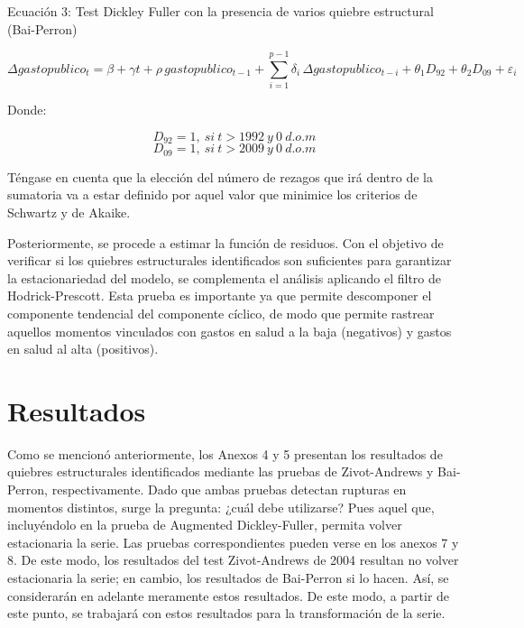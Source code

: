 \documentclass[12pt]{article}
\begin{document}
\bigskip
\begin{center}
Ecuación 3: Test Dickley Fuller con la presencia de varios quiebre estructural (Bai-Perron)
\end{center}
\begin{equation}
\Delta gastopublic{o}_{t} = \beta + \gamma t + \rho \, gastopublic{o}_{t-1} + \sum_{i=1}^{p-1} \delta_{i} \, \Delta gastopublic{o}_{t-i} + \theta_{1} D_{92} + \theta_{2} D_{09} + \varepsilon_{i}
\end{equation}
\begin{center}
Donde: 
\end{center}
\begin{equation*}
D_{92}=1,\ si\ t>1992\ y\ 0\ d.o.m
\end{equation*}
\begin{equation*}
D_{09}=1,\ si\ t>2009\ y\ 0\ d.o.m
\end{equation*}

Téngase en cuenta que la elección del número de rezagos que irá dentro de la sumatoria va a estar definido por aquel valor que minimice los criterios de Schwartz y de Akaike. 

Posteriormente, se procede a estimar la función de residuos. Con el objetivo de verificar si los quiebres estructurales identificados son suficientes para garantizar la estacionariedad del modelo, se complementa el análisis aplicando el filtro de Hodrick-Prescott. Esta prueba es importante ya que permite descomponer el componente tendencial del componente cíclico, de modo que permite rastrear aquellos momentos vinculados con gastos en salud a la baja (negativos) y gastos en salud al alta (positivos). 

\section{Resultados}

Como se mencionó anteriormente, los Anexos 4 y 5 presentan los resultados de quiebres estructurales identificados mediante las pruebas de Zivot-Andrews y Bai-Perron, respectivamente. Dado que ambas pruebas detectan rupturas en momentos distintos, surge la pregunta: ¿cuál debe utilizarse? Pues aquel que, incluyéndolo en la prueba de Augmented Dickley-Fuller, permita volver estacionaria la serie. Las pruebas correspondientes pueden verse en los anexos 7 y 8. De este modo, los resultados del test Zivot-Andrews de 2004 resultan no volver estacionaria la serie; en cambio, los resultados de Bai-Perron si lo hacen. Así, se considerarán en adelante meramente estos resultados. De este modo, a partir de este punto, se trabajará con estos resultados para la transformación de la serie. 
\end{document}
